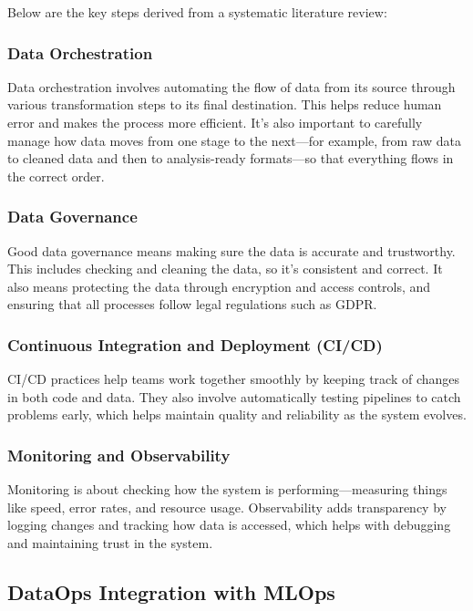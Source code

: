 Below are the key steps derived from a systematic literature review\cite{FANNOUCH2025100321}:

\subsubsection{Data Orchestration}
Data orchestration involves automating the flow of data from its source through various transformation steps to its final destination.
This helps reduce human error and makes the process more efficient.
It's also important to carefully manage how data moves from one stage to the next—for example,
from raw data to cleaned data and then to analysis-ready formats—so that everything flows in the correct order.

\subsubsection{Data Governance}
Good data governance means making sure the data is accurate and trustworthy.
This includes checking and cleaning the data, so it's consistent and correct.
It also means protecting the data through encryption and access controls,
and ensuring that all processes follow legal regulations such as GDPR.

\subsubsection{Continuous Integration and Deployment (CI/CD)}
CI/CD practices help teams work together smoothly by keeping track of changes in both code and data.
They also involve automatically testing pipelines to catch problems early,
which helps maintain quality and reliability as the system evolves.

\subsubsection{Monitoring and Observability}
Monitoring is about checking how the system is performing—measuring things like speed, error rates,
and resource usage.
Observability adds transparency by logging changes and tracking how data is accessed,
which helps with debugging and maintaining trust in the system.

\subsection{DataOps Integration with MLOps}\label{subsec:dataops-mlops-integration}


